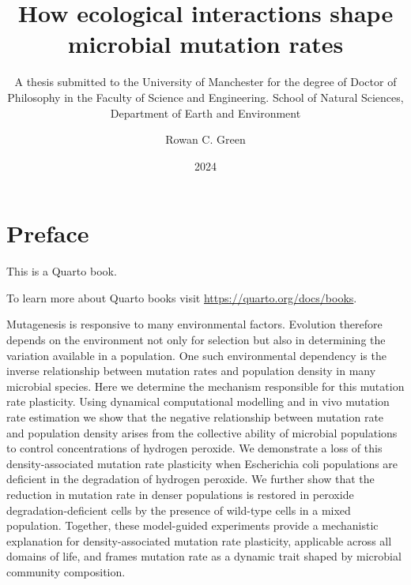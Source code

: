 \documentclass[
  12pt,
  letterpaper,
  DIV=11,
  numbers=noendperiod]{scrreprt}
\title{How ecological interactions shape microbial mutation rates}
\subtitle{A thesis submitted to the University of Manchester for the
degree of Doctor of Philosophy in the Faculty of Science and
Engineering. \textbar{} School of Natural Sciences, Department of Earth
and Environment}
\author{Rowan C. Green}
\date{2024}
\renewcommand*\contentsname{Table of contents}
\newcommand\contentsname{Table of contents}
\begin{document}
\maketitle
\ifdefined\Shaded\renewenvironment{Shaded}{\begin{tcolorbox}[borderline west={3pt}{0pt}{shadecolor}, sharp corners, interior hidden, frame hidden, breakable, boxrule=0pt, enhanced]}{\end{tcolorbox}}\fi

\renewcommand*\contentsname{Table of contents}
{
\hypersetup{linkcolor=}
\setcounter{tocdepth}{2}
\tableofcontents
}
\listoffigures
\listoftables
{}

\hypertarget{preface}{%
\chapter*{Preface}\label{preface}}


This is a Quarto book.

To learn more about Quarto books visit
\url{https://quarto.org/docs/books}.

Mutagenesis is responsive to many environmental factors. Evolution
therefore depends on the environment not only for selection but also in
determining the variation available in a population. One such
environmental dependency is the inverse relationship between mutation
rates and population density in many microbial species. Here we
determine the mechanism responsible for this mutation rate plasticity.
Using dynamical computational modelling and in vivo mutation rate
estimation we show that the negative relationship between mutation rate
and population density arises from the collective ability of microbial
populations to control concentrations of hydrogen peroxide. We
demonstrate a loss of this density-associated mutation rate plasticity
when Escherichia coli populations are deficient in the degradation of
hydrogen peroxide. We further show that the reduction in mutation rate
in denser populations is restored in peroxide degradation-deficient
cells by the presence of wild-type cells in a mixed population.
Together, these model-guided experiments provide a mechanistic
explanation for density-associated mutation rate plasticity, applicable
across all domains of life, and frames mutation rate as a dynamic trait
shaped by microbial community composition.

\end{document}
